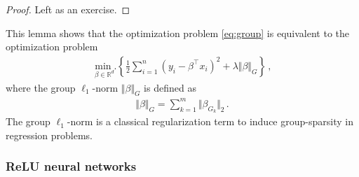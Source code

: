 \documentclass[11pt,reqno]{article}
\newcommand{\R}{\mathbb{R}}
\numberwithin{equation}{section}
\theoremstyle{plain}
\theoremstyle{definition}
\theoremstyle{remark}
\begin{document}
\begin{proof}
	Left as an exercise. 
\end{proof}

This lemma shows that the optimization problem \eqref{eq:group} is equivalent to the optimization problem
\begin{align}
	\label{eq:group-lasso}
	\underset{\beta \in \R^d}{\min.} \left\{\frac{1}{2} \sum_{i=1}^{n} \left(y_i - \beta^\top x_i\right)^2 + \lambda \Vert \beta \Vert_G \right\} \, ,
\end{align}
where the group $\ell_1$-norm $\Vert \beta \Vert_G$ is defined as 
\begin{align*}
	\Vert \beta \Vert_G = \sum_{k=1}^{m} \Vert \beta_{G_k} \Vert_2 \, .
\end{align*}
The group $\ell_1$-norm is a classical regularization term to induce group-sparsity in regression problems. 

\subsubsection{ReLU neural networks}
\end{document}

